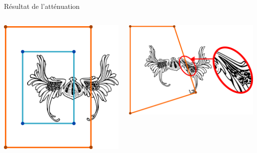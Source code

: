 \documentclass[xcolor=x11names,compress]{beamer}
\renewcommand{\(}{\begin{columns}} \renewcommand{\)}{\end{columns}}
\newcommand{\<}[1]{\begin{column}{#1}} \renewcommand{\>}{\end{column}}
\begin{document}
\begin{frame}{Résultat de l'atténuation}
  \begin{columns}[t]
    \begin{column}{0.5\textwidth}
      \centering
      \includegraphics[scale=0.15]{Deformation-Viking-Double-Avant}
    \end{column}
    \begin{column}{0.5\textwidth}
      \centering
      \includegraphics[scale=0.15]{Deformation-Viking-Simple-Avec}
    \end{column}
  \end{columns}
\end{frame}
\end{document}
